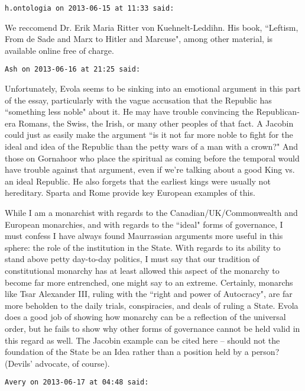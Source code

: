 \begin{footnotesize}\begin{sffamily}



\texttt{h.ontologia on 2013-06-15 at 11:33 said: }

We reccomend Dr. Erik Maria Ritter von Kuehnelt-Leddihn. His book, ``Leftism, From de Sade and Marx to Hitler and Marcuse", among other material, is available online free of charge.


\hfill

\texttt{Ash on 2013-06-16 at 21:25 said: }

Unfortunately, Evola seems to be sinking into an emotional argument in this part of the essay, particularly with the vague accusation that the Republic has ``something less noble" about it. He may have trouble convincing the Republican-era Romans, the Swiss, the Irish, or many other peoples of that fact. A Jacobin could just as easily make the argument ``is it not far more noble to fight for the ideal and idea of the Republic than the petty wars of a man with a crown?" And those on Gornahoor who place the spiritual as coming before the temporal would have trouble against that argument, even if we're talking about a good King vs. an ideal Republic. He also forgets that the earliest kings were usually not hereditary. Sparta and Rome provide key European examples of this. 

While I am a monarchist with regards to the Canadian/UK/Commonwealth and European monarchies, and with regards to the ``ideal" forms of governance, I must confess I have always found Maurrassian arguments more useful in this sphere: the role of the institution in the State. With regards to its ability to stand above petty day-to-day politics, I must say that our tradition of constitutional monarchy has at least allowed this aspect of the monarchy to become far more entrenched, one might say to an extreme. Certainly, monarchs like Tsar Alexander III, ruling with the ``right and power of Autocracy", are far more beholden to the daily trials, conspiracies, and deals of ruling a State. Evola does a good job of showing how monarchy can be a reflection of the universal order, but he fails to show why other forms of governance cannot be held valid in this regard as well. The Jacobin example can be cited here – should not the foundation of the State be an Idea rather than a position held by a person? (Devils' advocate, of course).


\hfill

\texttt{Avery on 2013-06-17 at 04:48 said: }


\end{sffamily}
\end{footnotesize}
